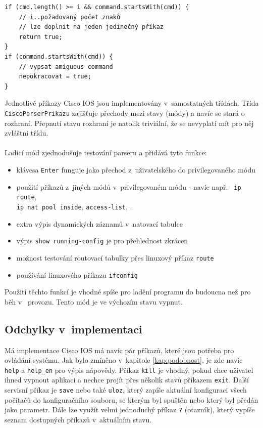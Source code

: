 \begin{verbatim}
if (cmd.length() >= i && command.startsWith(cmd)) {
    // i..požadovaný počet znaků 
    // lze doplnit na jeden jedinečný příkaz
    return true;
}
if (command.startsWith(cmd)) {
    // vypsat amiguous command
    nepokracovat = true;
}
\end{verbatim}

Jednotlivé příkazy Cisco IOS jsou implementovány v~samostatných třídách. Třída \\\verb|CiscoParserPrikazu| zajišťuje přechody mezi stavy (módy) a navíc se stará o  rozhraní. Přepnutí stavu rozhraní je natolik triviální, že se nevyplatí mít pro něj zvláštní třídu. 

\paragraph{}
Ladící mód zjednodušuje testování parseru a přidává tyto funkce:
\begin{itemize}
 \item klávesa \verb|Enter| funguje jako přechod z~uživatelského do privilegovaného módu
 \item použití příkazů z~jiných módů v~privilegovaném módu - navíc např. \verb| ip route|, \\\verb|ip nat pool inside|, \verb|access-list|, ..
 \item extra výpis dynamických záznamů v~natovací tabulce
 \item výpis \verb|show running-config| je pro přehlednost zkrácen
 \item možnost testování routovací tabulky přes linuxový příkaz \verb|route|
 \item používání linuxového příkazu \verb|ifconfig|
\end{itemize}
Použití těchto funkcí je vhodné spíše pro ladění programu do budoucna než pro běh v~ provozu. Tento mód je ve výchozím stavu vypnut.


\subsection{Odchylky v~implementaci}
Má implementace Cisco IOS má navíc pár příkazů, které jsou potřeba pro ovládání systému. Jak bylo zmíněno v~kapitole \ref{kap:podobnost}, je zde navíc \verb|help| a \verb|help_en| pro výpis nápovědy. Příkaz \verb|kill| je vhodný, pokud chce uživatel ihned vypnout aplikaci a nechce projít přes několik stavů příkazem \verb|exit|. Další servisní příkaz je \verb|save| nebo také \verb|uloz|, který zapíše aktuální konfiguraci všech počítačů do konfiguračního souboru, se kterým byl spuštěn nebo který byl předán jako parametr. Dále lze využít velmi jednoduchý příkaz \verb|?| (otazník), který vypíše seznam dostupných příkazů v~aktuálním stavu.

